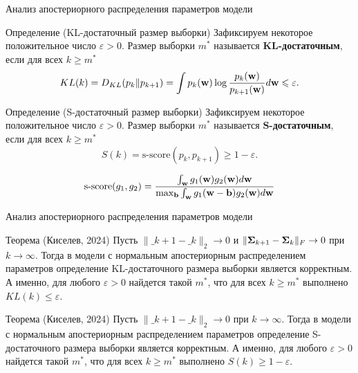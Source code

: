 \documentclass[10pt]{beamer}
\begin{document}
\begin{frame}{Анализ апостериорного распределения параметров модели}
    \begin{block}{Определение (KL-достаточный размер выборки)}
        Зафиксируем некоторое положительное число $\varepsilon > 0$. Размер выборки $m^*$ называется \textbf{KL-достаточным}, если для всех $k \geqslant m^*$
        \[ KL(k) = D_{KL}(p_k \| p_{k+1}) = \int p_k(\mathbf{w}) \log{\dfrac{p_k(\mathbf{w})}{p_{k+1}(\mathbf{w})}} d\mathbf{w} \leqslant \varepsilon. \]
    \end{block}
    \vspace{-0.5cm}
    \begin{block}{Определение (S-достаточный размер выборки)}
        Зафиксируем некоторое положительное число $\varepsilon > 0$. Размер выборки $m^*$ называется \textbf{S-достаточным}, если для всех $k \geqslant m^*$
        \[ S(k) = \text{s-score}(p_k, p_{k+1}) \geqslant 1-\varepsilon. \]
    \end{block}
    \vspace{-0.5cm}
    \[ \text{s-score}(g_1, g_2) = \dfrac{\int_{\mathbf{w}} g_1(\mathbf{w}) g_2(\mathbf{w}) d\mathbf{w}}{\max_{\mathbf{b}} \int_{\mathbf{w}} g_1(\mathbf{w} - \mathbf{b}) g_2(\mathbf{w}) d\mathbf{w}} \]
\end{frame}
\begin{frame}{Анализ апостериорного распределения параметров модели}
    \begin{block}{Теорема (Киселев, 2024)}
        Пусть $\| \bm_{k+1} - \bm_k \|_2 \to 0$ и $\| \boldsymbol{\Sigma}_{k+1} - \boldsymbol{\Sigma}_k \|_{F} \to 0$ при $k \to \infty$. Тогда в модели с нормальным апостериорным распределением параметров определение KL-достаточного размера выборки является корректным. А именно, для любого $\varepsilon > 0$ найдется такой $m^*$, что для всех $k \geqslant m^*$ выполнено $KL(k) \leqslant \varepsilon$.
    \end{block}
    \vfill
    \begin{block}{Теорема (Киселев, 2024)}
        Пусть $\| \bm_{k+1} - \bm_k \|_2 \to 0$ при $k \to \infty$. Тогда в модели с нормальным апостериорным распределением параметров определение S-достаточного размера выборки является корректным. А именно, для любого $\varepsilon > 0$ найдется такой $m^*$, что для всех $k \geqslant m^*$ выполнено $S(k) \geqslant 1-\varepsilon$.
    \end{block}
\end{frame}
\end{document}

